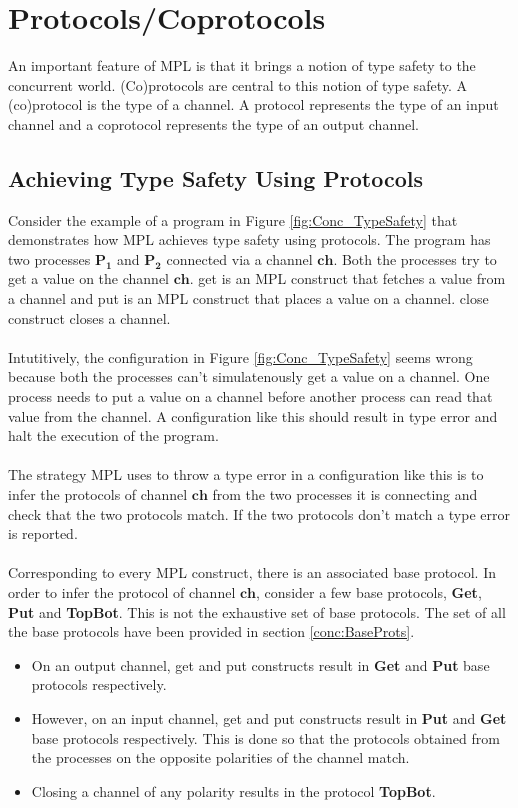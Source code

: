 \documentclass[11pt]{article}
\newcommand{\<}{\langle}
\renewcommand{\>}{\rangle}
\begin{document}
\section {Protocols/Coprotocols}\label{Conc:Protcols}
An important feature of MPL is that it brings a notion of type safety to the concurrent world. (Co)protocols are central to this notion of type safety. A (co)protocol is the type of a channel. A protocol represents the type of an input channel and a coprotocol represents the type of an output channel. 

\subsection {Achieving Type Safety Using Protocols}
Consider the example of a program in Figure \ref {fig:Conc_TypeSafety} that demonstrates how MPL achieves type safety using protocols. The program has two processes $\mathbf{P_1}$ and $\mathbf{P_2}$ connected via a channel $\mathbf{ch}$. Both the processes try to get a value on the channel $\mathbf{ch}$. {\sf get} is an MPL construct that fetches a value from a channel and {\sf put} is an MPL construct that places a value on a channel. {\sf close} construct closes a channel. 
~~\\~~\\
Intutitively, the configuration in Figure \ref {fig:Conc_TypeSafety} seems wrong because both the processes can't simulatenously get a value on a channel. One process needs to put a value on a channel before another process can read that value from the channel. A configuration like this should result in type error and halt the execution of the program. 
~~\\~~\\
The strategy MPL uses to throw a type error in a configuration like this is to infer the protocols of channel $\mathbf{ch}$ from the two processes it is connecting and check that the two protocols match. If the two protocols don't match a type error is reported.
~~\\~~\\  
Corresponding to every MPL construct, there is an associated base protocol. In order to infer the protocol of channel  $\mathbf{ch}$, consider a few base protocols, {\bf Get}, {\bf Put} and {\bf TopBot}. This is not the exhaustive set of base protocols. The set of all the base protocols have been provided in section \ref {conc:BaseProts}.  
\begin{itemize}
  \item On an output channel, {\sf get} and {\sf put} constructs result in {\bf Get} and {\bf Put} base protocols respectively.
  \item  However, on an input channel,  {\sf get} and {\sf put} constructs result in {\bf Put} and {\bf Get} base protocols respectively. This is done so that the protocols obtained from the processes on the opposite polarities of the channel match.
  \item Closing a channel of any polarity results in the protocol {\bf TopBot}.
\end{itemize}
\end{document}
